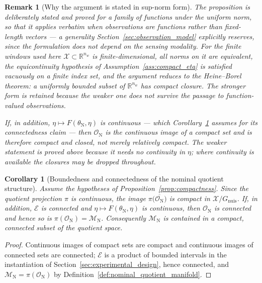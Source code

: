 \documentclass[a4paper]{cas-sc}
\newtheorem{corollary}{Corollary}
\newtheorem{remark}{Remark}
\newcommand{\X}{\ensuremath{\mathcal{X}}}
\newcommand{\EtaSpace}{\ensuremath{\mathcal{E}}}
\newcommand{\Mnominal}{\ensuremath{\mathcal{M}_{\mathrm{N}}}}
\newcommand{\R}{\ensuremath{\mathbb{R}}}
\newcommand{\quotient}{\ensuremath{\mathcal{X}/G_{\mathrm{nuis}}}}
\begin{document}
\begin{remark}[Why the argument is stated in sup-norm form]
\label{rem:why_arzela_ascoli}
The proposition is deliberately stated and proved for a family of functions
under the uniform norm, so that it applies verbatim when observations are
functions rather than fixed-length vectors --- a generality
Section~\ref{sec:observation_model} explicitly reserves, since the formulation
does not depend on the sensing modality. For the finite windows used here
\(\X\subset\R^{n_w}\) is finite-dimensional, all norms on it are equivalent,
the equicontinuity hypothesis of Assumption~\ref{ass:compact_eta} is satisfied
vacuously on a finite index set, and the argument reduces to the
Heine--Borel theorem: a uniformly bounded subset of \(\R^{n_w}\) has compact
closure. The stronger form is retained because the weaker one does not survive
the passage to function-valued observations.

If, in addition, \(\eta\mapsto F(\theta_{\mathrm N},\eta)\) is continuous ---
which Corollary~\ref{cor:bounded_manifold} assumes for its connectedness
claim --- then \(\mathcal{O}_{\mathrm N}\) is the continuous image of a compact
set and is therefore compact and closed, not merely relatively compact. The
weaker statement is proved above because it needs no continuity in \(\eta\);
where continuity is available the closures may be dropped throughout.
\end{remark}

\begin{corollary}[Boundedness and connectedness of the nominal quotient structure]
\label{cor:bounded_manifold}
Assume the hypotheses of Proposition~\ref{prop:compactness}. Since the
quotient projection \(\pi\) is continuous, the image
\(\pi\bigl(\overline{\mathcal{O}_{\mathrm N}}\bigr)\) is compact in
\(\quotient\). If, in addition, \(\EtaSpace\) is connected and
\(\eta\mapsto F(\theta_{\mathrm N},\eta)\) is continuous, then
\(\mathcal{O}_{\mathrm N}\) is connected and hence so is
\(\pi(\mathcal{O}_{\mathrm N}) = \Mnominal\). Consequently \(\Mnominal\) is
contained in a compact, connected subset of the quotient space.
\end{corollary}

\begin{proof}
Continuous images of compact sets are compact and continuous images of
connected sets are connected; \(\EtaSpace\) is a product of bounded
intervals in the instantiation of
Section~\ref{sec:experimental_design}, hence connected, and
\(\Mnominal=\pi(\mathcal{O}_{\mathrm N})\) by
Definition~\ref{def:nominal_quotient_manifold}.
\end{proof}
\end{document}
